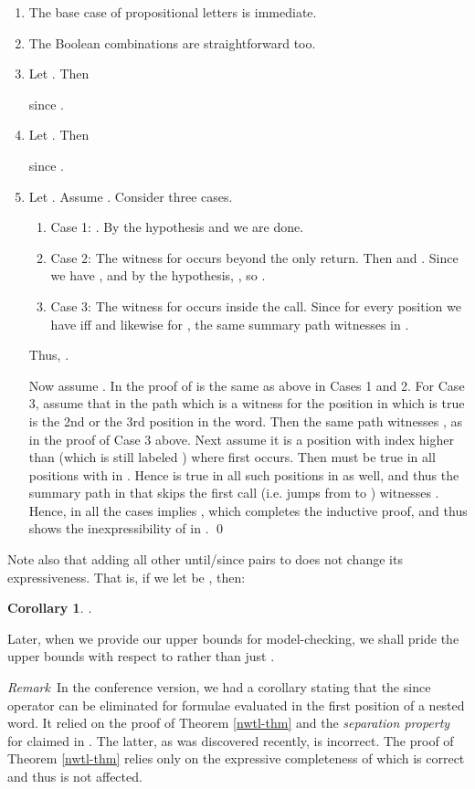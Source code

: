 \documentclass{LMCS}
\theoremstyle{plain}
\newtheorem{corollary}[theorem]{Corollary}
\theoremstyle{definition}
\begin{document}
\begin{enumerate}[]
\item The base case of propositional letters is immediate.
\item The Boolean combinations are straightforward too.
\item Let . Then 

since .
\item Let . Then 

since .
\item Let . Assume
  . Consider three cases.
\begin{enumerate}[(1)]
\item[]Case 1: . By the hypothesis
   and we are done. 

\item[]Case 2: The witness for  occurs beyond the only
  return. Then  and
  . Since  we have
  , and by the hypothesis,
  , so .


\item[]Case 3: The witness for  occurs inside the
  call. Since for every position  we have 
  iff  and likewise for , the same summary
  path witnesses  in . 
\end{enumerate}
Thus, . 

Now assume . In the proof of
 is the same as above in Cases 1 and 2. For
Case 3, assume that in the path which is a witness for 
the position in which  is true is the 2nd or the 3rd position in
the word. Then the same path witnesses , as in
the proof of Case 3 above. Next assume it is a position with index 
higher than  (which is still labeled ) where  first
occurs. Then  must be true in all positions  with  in . Hence  is true in all such positions in
 as well, and thus the summary path in  that skips the
first call (i.e. jumps from  to ) witnesses . Hence, in all the cases
 implies , which
completes the inductive proof, and thus shows the inexpressibility of
 in . 
\qed
\end{enumerate}

\noindent
Note also that adding all other until/since pairs 
to  does not
change its expressiveness. That is, if we let  be 
, then:
\begin{corollary}
.
\end{corollary}

Later, when we provide our upper bounds for model-checking,
we shall pride the upper bounds
with respect to   rather than just .

{\em Remark}\ In the conference version, we had a corollary stating
that the since operator can be eliminated for formulae evaluated in
the first position of a nested word. It relied on the proof of Theorem
\ref{nwtl-thm} and the {\em separation property} for  claimed
in \cite{marx-pods04}. The latter, as was discovered recently, is
incorrect. The proof of  Theorem
\ref{nwtl-thm} relies only on the expressive completeness of 
which is correct \cite{Schl92,marx-tods} and thus is not affected.
\end{document}
